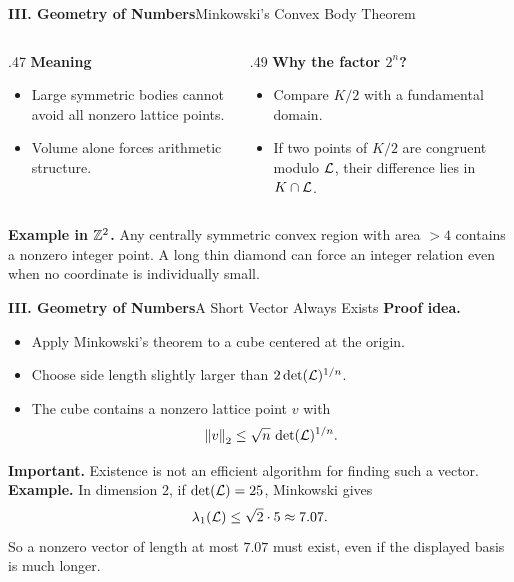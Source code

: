 \begin{frame}[shrink=5]{\textbf{III. Geometry of Numbers}}{Minkowski's Convex Body Theorem}
\begin{columns}[T,onlytextwidth]
\begin{column}{.47\textwidth}
\textcolor{TealDarkCyan}{\textbf{Meaning}}
\begin{itemize}
  \item Large symmetric bodies cannot avoid all nonzero lattice points.
  \item Volume alone forces arithmetic structure.
\end{itemize}
\end{column}
\begin{column}{.49\textwidth}
\textcolor{TealDarkCyan}{\textbf{Why the factor $2^n$?}}
\begin{itemize}
  \item Compare $K/2$ with a fundamental domain.
  \item If two points of $K/2$ are congruent modulo $\mathcal{L}$, their difference lies in $K\cap\mathcal{L}$.
\end{itemize}
\end{column}
\end{columns}
\textbf{Example in $\mathbb{Z}^2$.}\; Any centrally symmetric convex region with area $>4$ contains a nonzero integer point.
A long thin diamond can force an integer relation even when no coordinate is individually small.
\end{frame}

\begin{frame}[shrink=8]{\textbf{III. Geometry of Numbers}}{A Short Vector Always Exists}
\textbf{Proof idea.}
\begin{itemize}
  \item Apply Minkowski's theorem to a cube centered at the origin.
  \item Choose side length slightly larger than $2\det(\mathcal{L})^{1/n}$.
  \item The cube contains a nonzero lattice point $v$ with
  \[
    \left\lVert v\right\rVert_2\le \sqrt{n}\,\det(\mathcal{L})^{1/n}.
  \]
\end{itemize}
\bigskip
\textbf{\color{red}Important.}\; Existence is not an efficient algorithm for finding such a vector.
\textbf{Example.}\; In dimension $2$, if $\det(\mathcal{L})=25$, Minkowski gives
\[
  \lambda_1(\mathcal{L})\le \sqrt2\cdot5\approx 7.07.
\]
So a nonzero vector of length at most $7.07$ must exist, even if the displayed basis is much longer.
\end{frame}

